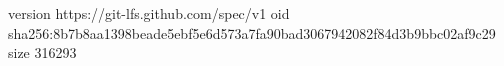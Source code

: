 version https://git-lfs.github.com/spec/v1
oid sha256:8b7b8aa1398beade5ebf5e6d573a7fa90bad3067942082f84d3b9bbc02af9c29
size 316293
